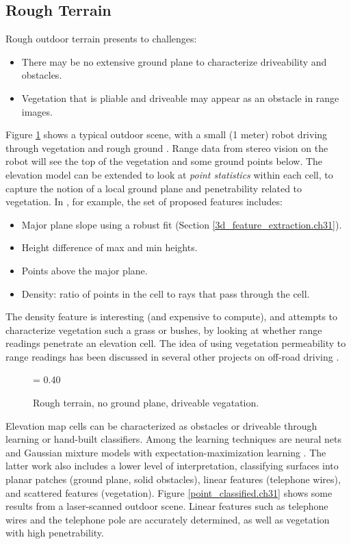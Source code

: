 \documentclass[twocolumn,oneside]{book}
\begin{document}
\subsection{Rough Terrain} \label{ch31.roughterrain}

Rough outdoor terrain presents to challenges:
\begin{itemize}
\item There may be no extensive ground plane to characterize
driveability and obstacles.
\item Vegetation that is pliable and driveable may appear as an
obstacle in range images.
\end{itemize}

Figure \ref{rough_terrain.ch31} shows a typical outdoor scene, with a
small (1 meter) robot driving through vegetation and rough ground
\cite{konolige06}.  Range data from stereo vision on the robot will
see the top of the vegetation and some ground points below.  The
elevation model can be extended to look at {\em point statistics}
within each cell, to capture the notion of a local ground plane and
penetrability related to vegetation.  In \cite{ollis06}, for
example, the set of proposed features includes:
\begin{itemize}
\item Major plane slope using a robust fit (Section
\ref{3d_feature_extraction.ch31}). 
\item Height difference of max and min heights.
\item Points above the major plane.
\item Density: ratio of points in the cell to rays that pass through
the cell.
\end{itemize}
The density feature is interesting (and expensive to compute), and
attempts to characterize vegetation such a grass or bushes, by looking
at whether range readings penetrate an elevation cell.  The idea of
using vegetation permeability to range readings has been discussed in
several other projects on off-road driving
\cite{manduchi03,lalonde05,kelly05}.  

\begin{figure}[hbt]
{\epsfxsize = 0.40\textwidth {}}
\caption{Rough terrain, no ground plane, driveable vegatation.
\label{rough_terrain.ch31}}
\end{figure}

Elevation map cells can be characterized as obstacles or driveable
through learning or hand-built classifiers.  Among the learning
techniques are neural nets \cite{ollis06} and Gaussian mixture
models with expectation-maximization learning \cite{vandapel06}.
The latter work also includes a lower level of interpretation,
classifying surfaces into planar patches (ground plane, solid
obstacles), linear features (telephone wires), and scattered features
(vegetation).  Figure \ref{point_classified.ch31} shows some results
from a laser-scanned outdoor scene.  Linear features such as telephone
wires and the telephone pole are accurately determined, as well as
vegetation with high penetrability.
\end{document}
